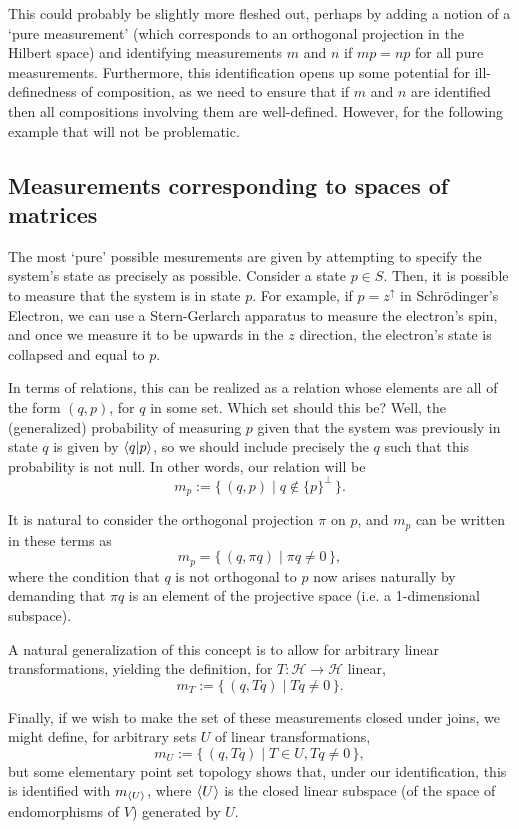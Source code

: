 \documentclass{article}
\theoremstyle{definition}
\theoremstyle{plain}
\newcommand{\HH}{\mathcal{H}}
\begin{document}
This could probably be slightly more fleshed out, perhaps by adding a notion of a `pure measurement' (which corresponds to an orthogonal projection in the Hilbert space) and identifying measurements $m$ and $n$ if $mp = np$ for all pure measurements. Furthermore, this identification opens up some potential for ill-definedness of composition, as we need to ensure that if $m$ and $n$ are identified then all compositions involving them are well-defined. However, for the following example that will not be problematic.

\subsection{Measurements corresponding to spaces of matrices}

The most `pure' possible mesurements are given by attempting to specify the system's state as precisely as possible. Consider a state $p \in S$. Then, it is possible to measure that the system is in state $p$. For example, if $p = z^\uparrow$ in Schrödinger's Electron, we can use a Stern-Gerlarch apparatus to measure the electron's spin, and once we measure it to be upwards in the $z$ direction, the electron's state is collapsed and equal to $p$.

In terms of relations, this can be realized as a relation whose elements are all of the form $(q, p)$, for $q$ in some set. Which set should this be? Well, the (generalized) probability of measuring $p$ given that the system was previously in state $q$ is given by $\braket{q|p}$, so we should include precisely the $q$ such that this probability is not null. In other words, our relation will be
\[m_p := \{\, (q,p) \mid q \not \in \{p\}^\perp\,\}.\]

It is natural to consider the orthogonal projection $\pi$ on $p$, and $m_p$ can be written in these terms as
\[m_p = \{\, (q, \pi q) \mid \pi q \neq 0\,\},\]
where the condition that $q$ is not orthogonal to $p$ now arises naturally by demanding that $\pi q$ is an element of the projective space (i.e. a 1-dimensional subspace).

A natural generalization of this concept is to allow for arbitrary linear transformations, yielding the definition, for $T : \HH \to \HH$ linear,
\[m_T := \{\, (q, Tq) \mid Tq \neq 0\,\}.\]

Finally, if we wish to make the set of these measurements closed under joins, we might define, for arbitrary sets $U$ of linear transformations,
\[m_U := \{\, (q, Tq) \mid T \in U, Tq \neq 0 \,\},\]
but some elementary point set topology shows that, under our identification, this is identified with $m_{\braket U}$, where $\braket U$ is the closed linear subspace (of the space of endomorphisms of $V$) generated by $U$.
\end{document}
